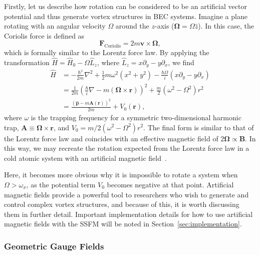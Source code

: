 Firstly, let us describe how rotation can be considered to be an artificial vector potential and thus generate vortex structures in BEC systems.
Imagine a plane rotating with an angular velocity $\Omega$ around the $z$-axis ($\mathbf{\Omega} = \Omega \hat z$). 
In this case, the Coriolis force is defined as
\begin{equation}
\mathbf{F}_{\text{Coriolis}} = 2m \mathbf{v} \times \mathbf{\Omega},
\end{equation}
which is formally similar to the Lorentz force law.
By applying the transformation $\hat H = \hat H_0 - \Omega \hat L_z$, where $\hat L_z = x\partial_y - y\partial_x$, we find~\cite{Bhat2008}
\begin{equation}
\begin{split}
\hat H &= -\frac{\hbar^2}{2m}\nabla^2 + \frac 1 2 m \omega^2(x^2 + y^2) - \frac{\hbar \Omega}{i}(x\partial_y - y\partial_x) \\
 &= \frac{1}{2m}\left(\frac{\hbar}{i}\nabla - m(\mathbf{\Omega} \times \mathbf{r})\right)^2 + \frac m 2 \left( \omega^2 - \Omega^2 \right)r^2 \\
 &= \frac{(\hat{\mathbf{p}}-m\mathbf{A}(\mathbf{r}))^2}{2m}+ V_0(\mathbf{r}),
\end{split}
\end{equation}
where $\omega$ is the trapping frequency for a symmetric two-dimensional harmonic trap, $\mathbf{A} \equiv \mathbf{\Omega} \times \mathbf{r}$, and $V_0 = m/2 \left( \omega^2 - \Omega^2 \right)r^2$.
The final form is similar to that of the Lorentz force law and coincides with an effective magnetic field of $2 \mathbf \Omega \propto \mathbf B$.
In this way, we may recreate the rotation expected from the Lorentz force law in a cold atomic system with an artificial magnetic field~\cite{Peshkin1989, Madison2000, Abo-Shaeer2001}.

Here, it becomes more obvious why it is impossible to rotate a system when $\Omega > \omega_x$, as the potential term $V_0$ becomes negative at that point.
Artificial magnetic fields provide a powerful tool to researchers who wish to generate and control complex vortex structures, and because of this, it is worth discussing them in further detail.
Important implementation details for how to use artificial magnetic fields with the SSFM will be noted in Section~\ref{sec:implementation}.

\subsubsection{Geometric Gauge Fields}
\label{sec:geom}

